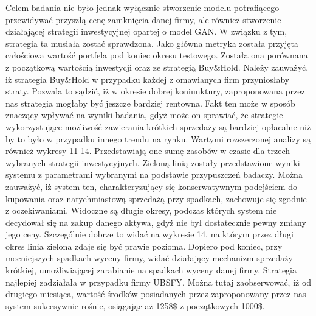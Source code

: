 \documentclass[review]{elsarticle} %
\begin{document}
Celem badania nie było jednak wyłącznie stworzenie modelu potrafiącego przewidywać przyszłą cenę zamknięcia danej firmy, ale również stworzenie działającej strategii inwestycyjnej opartej o model GAN.  W związku z tym, strategia ta musiała zostać sprawdzona. Jako główna metryka została przyjęta całościowa wartość portfela pod koniec okresu testowego. Została ona porównana z początkową wartością inwestycji oraz ze strategią Buy\&Hold. Należy zauważyć, iż strategia Buy\&Hold w przypadku każdej z omawianych firm przyniosłaby straty. Pozwala to sądzić, iż w okresie dobrej koniunktury, zaproponowana przez nas strategia mogłaby być jeszcze bardziej rentowna. Fakt ten może w sposób znaczący wpływać na wyniki badania, gdyż może on sprawiać, że strategie wykorzystujące możliwość zawierania krótkich sprzedaży są bardziej opłacalne niż by to było w przypadku innego trendu na rynku. 
Wartymi rozszerzonej analizy są również wykresy 11-14. Przedstawiają one sumę zasobów w czasie dla trzech wybranych strategii inwestycyjnych. Zieloną linią zostały przedstawione wyniki systemu z parametrami wybranymi na podstawie przypuszczeń badaczy. Można  zauważyć, iż system ten, charakteryzujący się konserwatywnym podejściem do kupowania oraz natychmiastową sprzedażą przy spadkach, zachowuje się zgodnie z oczekiwaniami. Widoczne są długie okresy, podczas których system nie decydował się na zakup danego aktywa, gdyż nie był dostatecznie pewny zmiany jego ceny. Szczególnie dobrze to widać na wykresie 14, na którym przez długi okres linia zielona zdaje się być prawie pozioma. Dopiero pod koniec, przy mocniejszych spadkach wyceny firmy, widać działający mechanizm sprzedaży krótkiej, umożliwiającej zarabianie na spadkach wyceny danej firmy. Strategia najlepiej zadziałała w przypadku firmy UBSFY. Można tutaj zaobserwować, iż od drugiego miesiąca, wartość środków posiadanych przez zaproponowany przez nas system sukcesywnie rośnie, osiągając aż 1258\$ z początkowych 1000\$.

\pagebreak

\listoffigures
\listoftables
\end{document}
